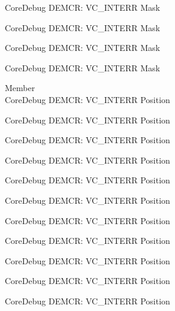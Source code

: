 \begin{DoxyRefList}
\label{deprecated__deprecated001003}%
%
Core\+Debug DEMCR\+: VC\+\_\+\+INTERR Mask 

\label{deprecated__deprecated001079}%
%
Core\+Debug DEMCR\+: VC\+\_\+\+INTERR Mask 

\label{deprecated__deprecated001168}%
%
Core\+Debug DEMCR\+: VC\+\_\+\+INTERR Mask 

\label{deprecated__deprecated001270}%
%
Core\+Debug DEMCR\+: VC\+\_\+\+INTERR Mask  
\item[Member \doxylink{group___c_m_s_i_s___core_debug_ga22079a6e436f23b90308be97e19cf07e}{Core\+Debug\+\_\+\+DEMCR\+\_\+\+VC\+\_\+\+INTERR\+\_\+\+Pos} ]\hfill \\
\label{deprecated__deprecated000057}%
%
Core\+Debug DEMCR\+: VC\+\_\+\+INTERR Position 

\label{deprecated__deprecated000201}%
%
Core\+Debug DEMCR\+: VC\+\_\+\+INTERR Position 

\label{deprecated__deprecated000343}%
%
Core\+Debug DEMCR\+: VC\+\_\+\+INTERR Position 

\label{deprecated__deprecated000419}%
%
Core\+Debug DEMCR\+: VC\+\_\+\+INTERR Position 

\label{deprecated__deprecated000508}%
%
Core\+Debug DEMCR\+: VC\+\_\+\+INTERR Position 

\label{deprecated__deprecated000610}%
%
Core\+Debug DEMCR\+: VC\+\_\+\+INTERR Position 

\label{deprecated__deprecated000716}%
%
Core\+Debug DEMCR\+: VC\+\_\+\+INTERR Position 

\label{deprecated__deprecated000860}%
%
Core\+Debug DEMCR\+: VC\+\_\+\+INTERR Position 

\label{deprecated__deprecated001002}%
%
Core\+Debug DEMCR\+: VC\+\_\+\+INTERR Position 

\label{deprecated__deprecated001078}%
%
Core\+Debug DEMCR\+: VC\+\_\+\+INTERR Position 

\label{deprecated__deprecated001167}%
%
Core\+Debug DEMCR\+: VC\+\_\+\+INTERR Position 


\end{DoxyRefList}
